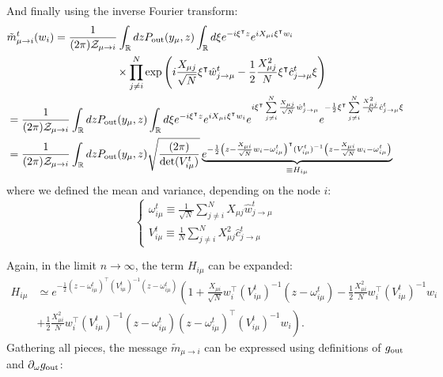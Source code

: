 \documentclass[aip,jmp,amsmath,amssymb,reprint]{revtex4}
\begin{document}
And finally using the inverse Fourier transform:
\begin{align*}
&\tilde{m}_{\mu \to i}^t (w_i ) = 
\frac{1}{(2\pi)\mathcal{Z}_{\mu \to i}}
\int_{\mathbb{R}} dz P_{\rm out}(y_\mu , z ) 
\int_{\mathbb{R}} d \xi  
e^{-i \xi^\intercal z}
e^{ i X_{\mu i} \xi^\intercal w_i} \\
&\qquad\qquad\qquad\qquad\qquad\times\prod\limits_{j\neq i}^N  \exp\left( i \frac{X_{\mu j}}{\sqrt{N}} \xi^\intercal \hat{w}_{j\to \mu}^t -  \frac{1}{2}\frac{X_{\mu j}^2}{N} \xi^\intercal \hat{c}_{j\to \mu}^t \xi\right) \\
&= \frac{1}{(2\pi)\mathcal{Z}_{\mu\to i}}
\int_{\mathbb{R}} dz
P_{\rm out}(y_\mu , z )
\int_{\mathbb{R}} d \xi  
e^{-i \xi^\intercal z}
e^{ i X_{\mu i} \xi^\intercal w_i} e^{i \xi^\intercal \sum\limits_{j\neq i}^N \frac{X_{\mu j}}{\sqrt{N}} \hat{w}_{j\to \mu}^t } e^{-  \frac{1}{2} \xi^\intercal \sum\limits_{j\neq i}^N \frac{X_{\mu j}^2}{N}   \hat{c}_{j \to \mu }^t\xi} \\
&= \frac{1}{(2\pi)\mathcal{Z}_{\mu\to i}} \int_{\mathbb{R}} dzP_{\rm out}(y_\mu , z)\sqrt{\frac{(2\pi)}{\det(V_{i \mu }^t)}} \underbrace{e^{-\frac{1}{2} \left( z -\frac{X_{\mu i}}{\sqrt{N}} w_i -\omega_{i \mu}^t \right)^\intercal (V_{i \mu }^t)^{-1} \left( z -\frac{X_{\mu i}}{\sqrt{N}} w_i -\omega_{i \mu}^t \right)}}_{\equiv H_{i\mu}}
\end{align*}
where we defined the mean and variance, depending on the node $i$:
\begin{equation*}
	\begin{cases}
	\omega_{i \mu}^t \equiv  \frac{1}{\sqrt{N}} \sum\limits_{j\neq i}^N X_{\mu j}  \hat{w}_{j\to \mu}^t \\
		V_{i\mu}^t \equiv  \frac{1}{N} \sum\limits_{j\neq i}^N X_{\mu j}^2  \hat{c}_{j \to \mu}^t
	\end{cases}
\end{equation*}


Again, in the limit $n\to \infty$, the term $H_{i\mu}$ can be expanded:
\begin{align*}
	H_{i\mu} &\simeq   e^{-\frac{1}{2} \left( z -\omega_{i \mu}^t \right)^\intercal (V_{i\mu}^t)^{-1} \left( z -\omega_{i \mu}^t \right) } 
	\left( 1 + \frac{X_{\mu i}}{\sqrt{N}} w_i^\intercal (V_{i\mu}^t)^{-1} (z -\omega_{i \mu}^t) -\frac{1}{2}\frac{X_{\mu i}^2}{N} w_i^\intercal (V_{i\mu}^t)^{-1} w_i \right.\\
& \left. + \frac{1}{2} \frac{X_{\mu i}^2}{N} w_i^\intercal (V_{i\mu}^t)^{-1} (z -\omega_{i \mu}^t)(z -\omega_{i \mu}^t)^\intercal  (V_{i\mu}^t)^{-1} w_i \right).
\end{align*}
Gathering all pieces, the message $\tilde{m}_{\mu \to i}$ can be expressed using definitions of $g_{\rm out}$ and $\partial_{\omega} g_{\rm out}$:
\end{document}

